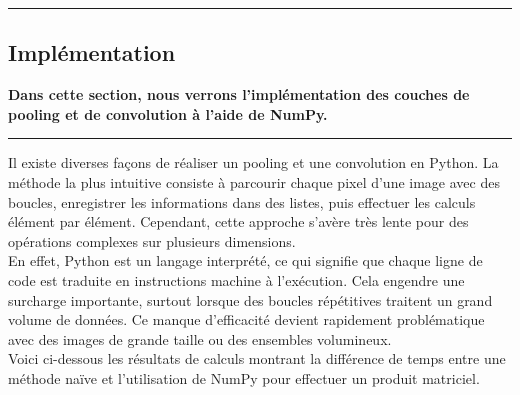 {\color{gray}\hrule}
\begin{center}
\section{Implémentation}
\textbf{Dans cette section, nous verrons l'implémentation des couches de 
pooling et de convolution à l'aide de NumPy.}
\bigskip
\end{center}
{\color{gray}\hrule}
\begin{multicols}{2}

Il existe diverses façons de réaliser un pooling et une convolution
en Python. La méthode la plus intuitive consiste à parcourir chaque pixel d’une
image avec des boucles, enregistrer les informations dans des listes, puis
effectuer les calculs élément par élément. Cependant, cette approche
s’avère très lente pour des opérations complexes sur plusieurs dimensions. \\

En effet, Python est un langage interprété, ce qui signifie que chaque
ligne de code est traduite en instructions machine à l’exécution.
Cela engendre une surcharge importante, surtout lorsque des boucles répétitives
traitent un grand volume de données. Ce manque d’efficacité devient rapidement problématique
avec des images de grande taille ou des ensembles volumineux. \\

Voici ci-dessous les résultats de calculs montrant la différence de temps entre une
méthode naïve et l’utilisation de NumPy pour effectuer un produit matriciel.\\

\renewcommand{\arraystretch}{1.5}

\\



\end{multicols}
